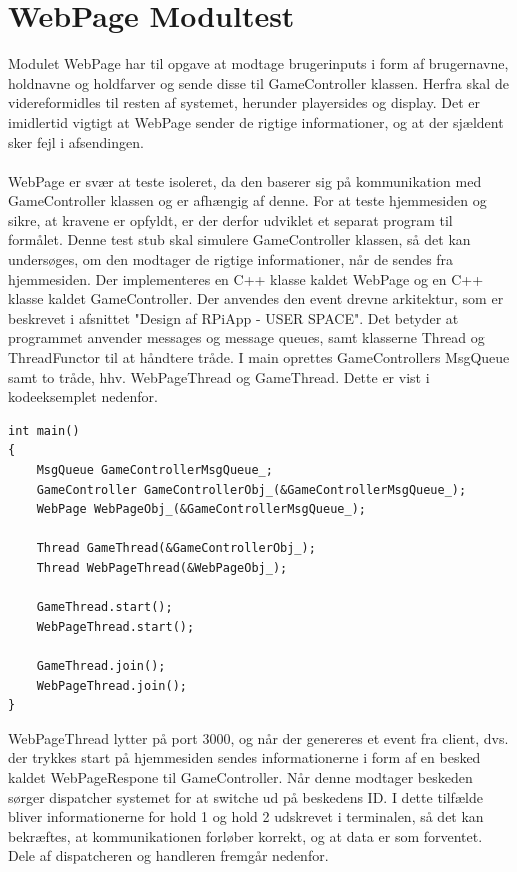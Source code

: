 \documentclass[Modultest/Modultest_main.tex]{subfiles}
\begin{document}
\lstset{style=customc}

\section{WebPage Modultest}

Modulet WebPage har til opgave at modtage brugerinputs i form af brugernavne, holdnavne og holdfarver og sende disse til GameController klassen. Herfra skal de videreformidles til resten af systemet, herunder playersides og display. Det er imidlertid vigtigt at WebPage sender de rigtige informationer, og at der sjældent sker fejl i afsendingen. \\\\WebPage er svær at teste isoleret, da den baserer sig på kommunikation med GameController klassen og er afhængig af denne. For at teste hjemmesiden og sikre, at kravene er opfyldt, er der derfor udviklet et separat program til formålet. Denne test stub skal simulere GameController klassen, så det kan undersøges, om den modtager de rigtige informationer, når de sendes fra hjemmesiden. Der implementeres en C++ klasse kaldet WebPage og en C++ klasse kaldet GameController. Der anvendes den event drevne arkitektur, som er beskrevet i afsnittet "Design af RPiApp - USER SPACE". Det betyder at programmet anvender messages og message queues, samt klasserne Thread og ThreadFunctor til at håndtere tråde. I main oprettes GameControllers MsgQueue samt to tråde, hhv. WebPageThread og GameThread. Dette er vist i kodeeksemplet nedenfor.
\begin{lstlisting}
int main()
{
    MsgQueue GameControllerMsgQueue_;
    GameController GameControllerObj_(&GameControllerMsgQueue_);
    WebPage WebPageObj_(&GameControllerMsgQueue_);

    Thread GameThread(&GameControllerObj_);
    Thread WebPageThread(&WebPageObj_);

    GameThread.start();
    WebPageThread.start();
	
    GameThread.join();
    WebPageThread.join();
}
\end{lstlisting}
WebPageThread lytter på port 3000, og når der genereres et event fra client, dvs. der trykkes start på hjemmesiden sendes informationerne i form af en besked kaldet WebPageRespone til GameController. Når denne modtager beskeden sørger dispatcher systemet for at switche ud på beskedens ID. I dette tilfælde bliver informationerne for hold 1 og hold 2 udskrevet i terminalen, så det kan bekræftes, at kommunikationen forløber korrekt, og at data er som forventet. Dele af dispatcheren og handleren fremgår nedenfor.
\end{document}
